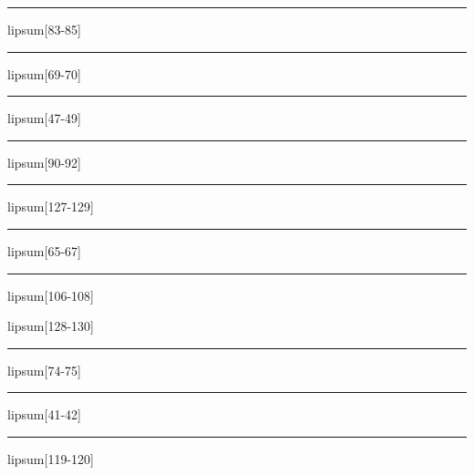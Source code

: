 \documentclass[11pt,a4paper]{article}
\begin{document}
\begin{simplewrap}
  \textcolor{red!38}{\rule{3.2cm}{2.3cm}}
\end{simplewrap}
lipsum[83-85]

\begin{simplewrap}
  \textcolor{red!15}{\rule{3.7cm}{7.4cm}}
\end{simplewrap}
lipsum[69-70]

\begin{simplewrap}
  \textcolor{cyan!40}{\rule{4.6cm}{5.5cm}}
\end{simplewrap}
lipsum[47-49]

\begin{simplewrap}
  \textcolor{olive!50}{\rule{5.4cm}{9.8cm}}
\end{simplewrap}
lipsum[90-92]

\begin{simplewrap}
  \textcolor{brown!52}{\rule{3.3cm}{3.3cm}}
\end{simplewrap}
lipsum[127-129]

\begin{simplewrap}
  \textcolor{pink!58}{\rule{4.7cm}{5.6cm}}
\end{simplewrap}
lipsum[65-67]

\begin{simplewrap}
  \textcolor{pink!42}{\rule{5.5cm}{2.0cm}}
\end{simplewrap}
lipsum[106-108]

lipsum[128-130]

\begin{simplewrap}
  \textcolor{blue!58}{\rule{3.2cm}{4.1cm}}
\end{simplewrap}
lipsum[74-75]

\begin{simplewrap}
  \textcolor{red!17}{\rule{3.1cm}{7.0cm}}
\end{simplewrap}
lipsum[41-42]

\begin{simplewrap}
  \textcolor{red!45}{\rule{4.2cm}{3.8cm}}
\end{simplewrap}
lipsum[119-120]
\end{document}
